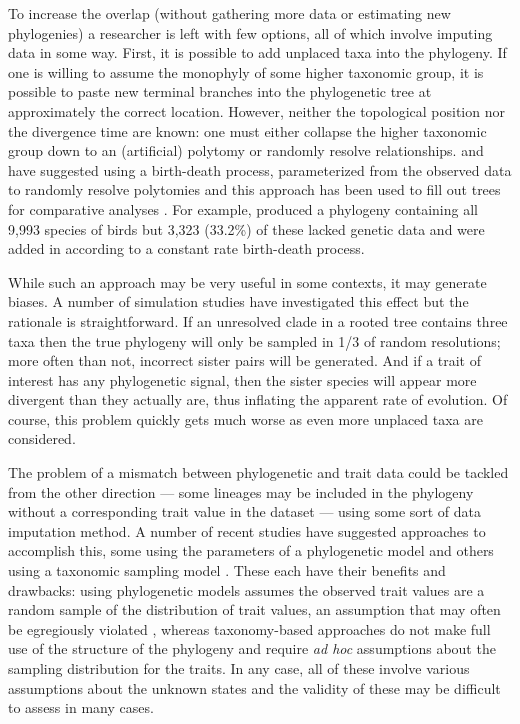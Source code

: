 \documentclass[a4paper,11pt]{article}
\begin{document}
To increase the overlap (without gathering more data or estimating new phylogenies) a researcher is left with few options, all of which involve imputing data in some way. First, it is possible to add unplaced taxa into the phylogeny. If one is willing to assume the monophyly of some higher taxonomic group, it is possible to paste new terminal branches into the phylogenetic tree at approximately the correct location. However, neither the topological position nor the divergence time are known: one must either collapse the higher taxonomic group down to an (artificial) polytomy or randomly resolve relationships. \citet{Kuhn2011} and \citet{ThomasPastis} have suggested using a birth-death process, parameterized from the observed data to randomly resolve polytomies \citep[see also][for a related approach for fossil trees]{Bapst2013} and this approach has been used to fill out trees for comparative analyses \citep{Jetz2012, Price2012, Rolland2014, Jetz2014}. For example, \citet{Jetz2012} produced a phylogeny containing all 9,993 species of birds but 3,323 (33.2\%) of these lacked genetic data and were added in according to a constant rate birth-death process.

While such an approach may be very useful in some contexts, it may generate biases. A number of simulation studies have investigated this effect \citep{Losos1994, Martins1996, Davies2012, Bapst2014, Rabosky2015} but the rationale is straightforward. If an unresolved clade in a rooted tree contains three taxa then the true phylogeny will only be sampled in 1/3 of random resolutions; more often than not, incorrect sister pairs will be generated. And if a trait of interest has any phylogenetic signal, then the sister species will appear more divergent than they actually are, thus inflating the apparent rate of evolution. Of course, this problem quickly gets much worse as even more unplaced taxa are considered.

The problem of a mismatch between phylogenetic and trait data could be tackled from the other direction --- some lineages may be included in the phylogeny without a corresponding trait value in the dataset --- using some sort of data imputation method. A number of recent studies have suggested approaches to accomplish this, some using the parameters of a phylogenetic model \citep{phylopars, Fagan2013, PEM, Swenson2014} and others using a taxonomic sampling model \citep{FitzJohn2014, Sandel2015}. These each have their benefits and drawbacks: using phylogenetic models assumes the observed trait values are a random sample of the distribution of trait values, an assumption that may often be egregiously violated \citep{FitzJohn2014}, whereas taxonomy-based approaches do not make full use of the structure of the phylogeny and require \emph{ad hoc} assumptions about the sampling distribution for the traits. In any case, all of these involve various assumptions about the unknown states and the validity of these may be difficult to assess in many cases.
\end{document}

